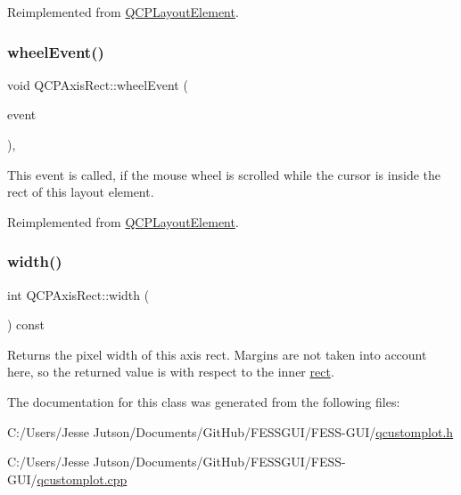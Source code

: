 Reimplemented from \hyperlink{class_q_c_p_layout_element_a929c2ec62e0e0e1d8418eaa802e2af9b}{Q\+C\+P\+Layout\+Element}.

\hypertarget{class_q_c_p_axis_rect_a5acf41fc30aa68ea263246ecfad85c31}{}\label{class_q_c_p_axis_rect_a5acf41fc30aa68ea263246ecfad85c31} 
\subsubsection{\texorpdfstring{wheel\+Event()}{wheelEvent()}}
{\footnotesize\ttfamily void Q\+C\+P\+Axis\+Rect\+::wheel\+Event (\begin{DoxyParamCaption}\item[{Q\+Wheel\+Event $\ast$}]{event }\end{DoxyParamCaption})\hspace{0.3cm}{\ttfamily [protected]}, {\ttfamily [virtual]}}

This event is called, if the mouse wheel is scrolled while the cursor is inside the rect of this layout element. 

Reimplemented from \hyperlink{class_q_c_p_layout_element_a300521d2fd18a893c1b85f6be11ce2bf}{Q\+C\+P\+Layout\+Element}.

\hypertarget{class_q_c_p_axis_rect_a204645398a4f9d0b0189385c7c2cfb91}{}\label{class_q_c_p_axis_rect_a204645398a4f9d0b0189385c7c2cfb91} 
\subsubsection{\texorpdfstring{width()}{width()}}
{\footnotesize\ttfamily int Q\+C\+P\+Axis\+Rect\+::width (\begin{DoxyParamCaption}{ }\end{DoxyParamCaption}) const\hspace{0.3cm}{\ttfamily [inline]}}

Returns the pixel width of this axis rect. Margins are not taken into account here, so the returned value is with respect to the inner \hyperlink{class_q_c_p_layout_element_a208effccfe2cca4a0eaf9393e60f2dd4}{rect}. 

The documentation for this class was generated from the following files\+:\begin{DoxyCompactItemize}
\item 
C\+:/\+Users/\+Jesse Jutson/\+Documents/\+Git\+Hub/\+F\+E\+S\+S\+G\+U\+I/\+F\+E\+S\+S-\/\+G\+U\+I/\hyperlink{qcustomplot_8h}{qcustomplot.\+h}\item 
C\+:/\+Users/\+Jesse Jutson/\+Documents/\+Git\+Hub/\+F\+E\+S\+S\+G\+U\+I/\+F\+E\+S\+S-\/\+G\+U\+I/\hyperlink{qcustomplot_8cpp}{qcustomplot.\+cpp}\end{DoxyCompactItemize}
